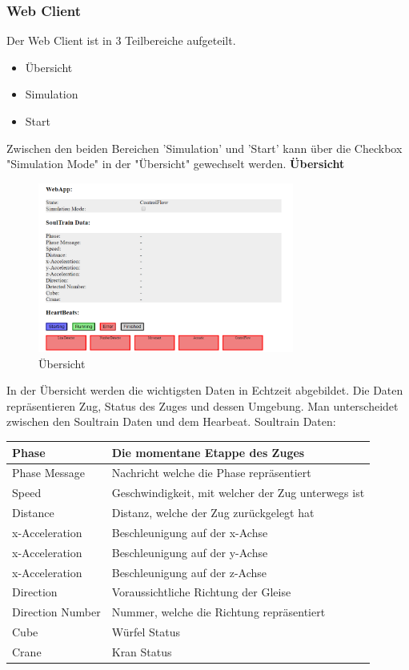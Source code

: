 \documentclass[../../main.tex]{subfiles}
\begin{document}
\subsubsection{Web Client}
Der Web Client ist in 3 Teilbereiche aufgeteilt.
\begin{itemize}
    \item Übersicht
    \item Simulation
    \item Start
\end{itemize}
Zwischen den beiden Bereichen 'Simulation' und 'Start' kann über die Checkbox "Simulation Mode" in der "Übersicht" gewechselt werden.
\textbf{Übersicht}\\
\begin{figure}[H] \centering
    \includegraphics[width=0.75\textwidth]{UebersichtWebApp}
    \caption{Übersicht}
    \label{fig:Uebersicht}
\end{figure}
In der Übersicht werden die wichtigsten Daten in Echtzeit abgebildet. Die Daten repräsentieren Zug, Status des Zuges und dessen Umgebung. 
Man unterscheidet zwischen den Soultrain Daten und dem Hearbeat.
Soultrain Daten:

\begin{table}[H]
    \begin{tabular}{ll}
    \hline
    Phase & Die momentane Etappe des Zuges \\ \hline
    Phase Message & Nachricht welche die Phase repräsentiert\\ \hline
    Speed & Geschwindigkeit, mit welcher der Zug unterwegs ist\\ \hline
    Distance & Distanz, welche der Zug zurückgelegt hat\\ \hline
    x-Acceleration & Beschleunigung auf der x-Achse  \\ \hline
    x-Acceleration & Beschleunigung auf der y-Achse \\ \hline
    x-Acceleration & Beschleunigung auf der z-Achse \\ \hline
    Direction & Voraussichtliche Richtung der Gleise \\ \hline
    Direction Number & Nummer, welche die Richtung repräsentiert \\ \hline
    Cube & Würfel Status \\ \hline
    Crane & Kran Status \\ \hline
    \end{tabular}
\end{table}
\end{document}
